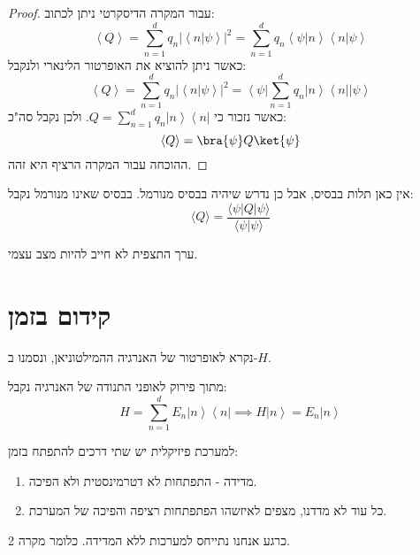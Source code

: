 \documentclass{tstextbook}
\begin{document}
\begin{proof}
עבור המקרה הדיסקרטי ניתן לכתוב:
$$\left\langle Q\right\rangle={\sum_{n=1}^{d}}q_{n}\left|\left\langle n|\psi\right\rangle\right|^{2}={\sum_{n=1}^{d}}q_{n}\left\langle\psi|n\right\rangle\left\langle n|\psi\right\rangle$$
כאשר ניתן להוציא את האופרטור הלינארי ולנקבל:
$$\left\langle Q\right\rangle={\sum_{n=1}^{d}}q_{n}\left|\left\langle n|\psi\right\rangle\right|^{2}=\left\langle\psi\right|{\sum_{n=1}^{d}}q_{n}\left|n\right\rangle\left\langle n\right|\left|\psi\right\rangle$$
כאשר נזכור כי \(Q=\sum_{n=1}^{d}q_{n}\left|n\right\rangle\left\langle n\right|\). ולכן נקבל סה"כ:
$$\langle Q \rangle =\bra{\psi} Q\ket{\psi}  $$
ההוכחה עבור המקרה הרציף היא זהה.

\end{proof}
\begin{remark}
אין כאן תלות בבסיס, אבל כן נדרש שיהיה בבסיס מנורמל. בבסיס שאינו מנורמל נקבל:
$$\langle Q\rangle =\frac{\langle \psi |Q  |\psi \rangle }{\langle\psi|\psi\rangle}$$

\end{remark}
\begin{remark}
ערך התצפית לא חייב להיות מצב עצמי.

\end{remark}
\section{קידום בזמן}

\begin{definition}[המילטוניאן]
נקרא לאופרטור של האנרגיה ההמילטוניאן, ונסמנו ב-\(H\).

\end{definition}
\begin{proposition}
מתוך פירוק לאופני התנודה של האנרגיה נקבל:
$$H=\sum_{n=1}^{d}\!E_{n}\left|n\right\rangle\left\langle n\right|\implies H\left|n\right\rangle=E_{n}\left|n\right\rangle$$

\end{proposition}
\begin{proposition}
למערכת פיזיקלית יש שתי דרכים להתפתח בזמן:

  \begin{enumerate}
    \item מדידה - התפתחות לא דטרמינסטית ולא הפיכה. 


    \item כל עוד לא מדדנו, מצפים לאיזשהו הפתפתחות רציפה והפיכה של המערכת. 


  \end{enumerate}
\end{proposition}
כרגע אנחנו נתייחס למערכות ללא המדידה. כלומר מקרה 2.
\end{document}
